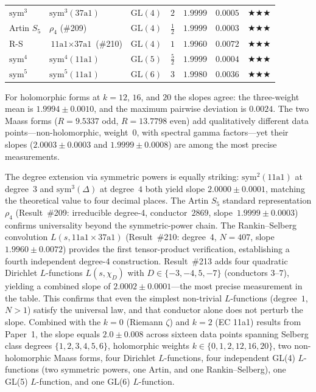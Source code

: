 \documentclass[11pt, a4paper]{article}
\theoremstyle{plain}
\theoremstyle{definition}
\begin{document}
\begin{table}[ht]
\begin{tabular}{llllrrl}
$\mathrm{sym}^{3}$ & $\mathrm{sym}^{3}(\text{37a1})$ & $\mathrm{GL}(4)$ & $2$ & $\mathbf{1.9999}$ & $\mathbf{0.0005}$ & $\bigstar\bigstar\bigstar$ \\
Artin $S_5$ & $\rho_4$ (\#209) & $\mathrm{GL}(4)$ & $\tfrac{1}{2}$ & $\mathbf{1.9999}$ & $\mathbf{0.0003}$ & $\bigstar\bigstar\bigstar$ \\
R-S & $\text{11a1}\times\text{37a1}$ (\#210) & $\mathrm{GL}(4)$ & $1$ & $\mathbf{1.9960}$ & $\mathbf{0.0072}$ & $\bigstar\bigstar\bigstar$ \\
$\mathrm{sym}^{4}$ & $\mathrm{sym}^{4}(\text{11a1})$ & $\mathrm{GL}(5)$ & $\tfrac{5}{2}$ & $\mathbf{1.9999}$ & $\mathbf{0.0004}$ & $\bigstar\bigstar\bigstar$ \\
$\mathrm{sym}^{5}$ & $\mathrm{sym}^{5}(\text{11a1})$ & $\mathrm{GL}(6)$ & $3$ & $\mathbf{1.9980}$ & $\mathbf{0.0036}$ & $\bigstar\bigstar\bigstar$ \\
\bottomrule
\end{tabular}
\end{table}

For holomorphic forms at $k=12$, $16$, and $20$ the slopes agree: the
three-weight mean is $1.9994\pm 0.0010$, and the maximum pairwise deviation
is $0.0024$.  The two Maass forms ($R=9.5337$ odd, $R=13.7798$ even) add
qualitatively different data points---non-holomorphic, weight~$0$, with
spectral gamma factors---yet their slopes ($2.0003\pm 0.0003$ and
$1.9999\pm 0.0008$) are among the most precise measurements.

The degree extension via symmetric powers is equally striking:
$\mathrm{sym}^{2}(\text{11a1})$ at degree~$3$ and $\mathrm{sym}^{3}(\Delta)$
at degree~$4$ both yield slope $2.0000\pm 0.0001$, matching the theoretical
value to four decimal places.  The Artin $S_5$ standard representation
$\rho_4$ (Result~\#209: irreducible degree-4, conductor~$2869$,
slope~$1.9999\pm 0.0003$) confirms universality beyond the
symmetric-power chain.  The Rankin--Selberg convolution
$L(s,\text{11a1}\times\text{37a1})$ (Result~\#210: degree~4, $N=407$,
slope~$1.9960\pm 0.0072$) provides the first tensor-product verification,
establishing a fourth independent degree-4 construction.
Result~\#213 adds four quadratic Dirichlet $L$-functions
$L(s,\chi_D)$ with $D\in\{-3,-4,5,-7\}$ (conductors $3$--$7$),
yielding a combined slope of $2.0002\pm 0.0001$---the most precise
measurement in the table.  This confirms that even the simplest
non-trivial $L$-functions (degree~$1$, $N>1$) satisfy the universal law,
and that conductor alone does not perturb the slope.
Combined with the $k=0$ (Riemann $\zeta$)
and $k=2$ (EC 11a1) results from Paper~1, the slope equals
$2.0\pm 0.008$ across sixteen data points spanning Selberg class degrees
$\{1,2,3,4,5,6\}$, holomorphic weights $k\in\{0,1,2,12,16,20\}$, two
non-holomorphic Maass forms, four Dirichlet $L$-functions,
four independent GL(4) $L$-functions
(two symmetric powers, one Artin, and one Rankin--Selberg),
one GL(5) $L$-function, and one GL(6) $L$-function.
\end{document}
